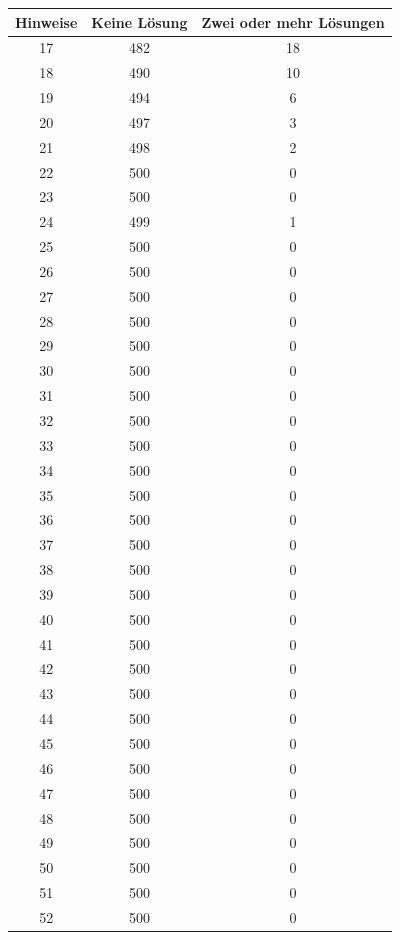 \documentclass[11pt,a4paper]{article}
\begin{document}
\begin{table}[htbp!] 
\scriptsize
\begin{center}
\begin{tabular}{|*{3}{c|}}
\hline 
Hinweise & Keine Lösung & Zwei oder mehr Lösungen\\ \hline 
17 & 482 & 18 \\ \hline 
 18 & 490 & 10 \\ \hline 
 19 & 494 & 6 \\ \hline 
 20 & 497 & 3 \\ \hline 
 21 & 498 & 2 \\ \hline 
 22 & 500 & 0 \\ \hline 
 23 & 500 & 0 \\ \hline 
 24 & 499 & 1 \\ \hline 
 25 & 500 & 0 \\ \hline 
 26 & 500 & 0 \\ \hline 
 27 & 500 & 0 \\ \hline 
 28 & 500 & 0 \\ \hline 
 29 & 500 & 0 \\ \hline 
 30 & 500 & 0 \\ \hline 
 31 & 500 & 0 \\ \hline 
 32 & 500 & 0 \\ \hline 
 33 & 500 & 0 \\ \hline 
 34 & 500 & 0 \\ \hline 
 35 & 500 & 0 \\ \hline 
 36 & 500 & 0 \\ \hline 
 37 & 500 & 0 \\ \hline 
 38 & 500 & 0 \\ \hline 
 39 & 500 & 0 \\ \hline 
 40 & 500 & 0 \\ \hline 
 41 & 500 & 0 \\ \hline 
 42 & 500 & 0 \\ \hline 
 43 & 500 & 0 \\ \hline 
 44 & 500 & 0 \\ \hline 
 45 & 500 & 0 \\ \hline 
 46 & 500 & 0 \\ \hline 
 47 & 500 & 0 \\ \hline 
 48 & 500 & 0 \\ \hline 
 49 & 500 & 0 \\ \hline 
 50 & 500 & 0 \\ \hline 
 51 & 500 & 0 \\ \hline 
 52 & 500 & 0 \\ \hline 

\end{tabular}
\end{center}
\end{table}
\end{document}
